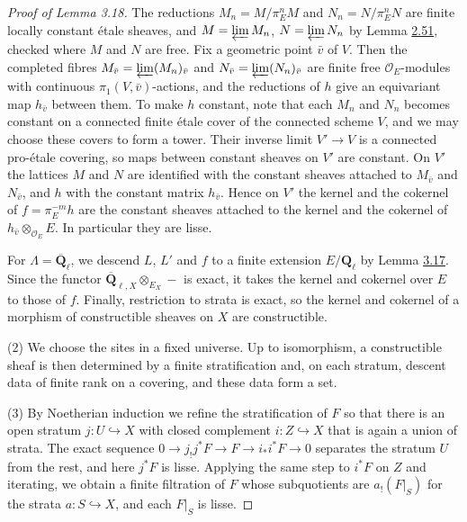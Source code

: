 \documentclass[11pt]{article}
\providecommand{\QbarX}{}\renewcommand{\QbarX}{\overline{\mathbf Q}_{\ell,X}}
\begin{document}
\begin{proof}[{Proof of Lemma 3.18}]
The reductions \(M_n=M/\pi_E^nM\) and \(N_n=N/\pi_E^nN\) are finite locally constant étale sheaves, and \(M=\varprojlim M_n\), \(N=\varprojlim N_n\) by Lemma \hyperref[bp158]{2.51}, checked where \(M\) and \(N\) are free. Fix a geometric point \(\bar v\) of \(V\). Then the completed fibres \(M_{\bar v}=\varprojlim(M_n)_{\bar v}\) and \(N_{\bar v}=\varprojlim(N_n)_{\bar v}\) are finite free \(\mathcal O_E\)-modules with continuous \(\pi_1(V,\bar v)\)-actions, and the reductions of \(h\) give an equivariant map \(h_{\bar v}\) between them. To make \(h\) constant, note that each \(M_n\) and \(N_n\) becomes constant on a connected finite étale cover of the connected scheme \(V\), and we may choose these covers to form a tower. Their inverse limit \(V'\to V\) is a connected pro-étale covering, so maps between constant sheaves on \(V'\) are constant. On \(V'\) the lattices \(M\) and \(N\) are identified with the constant sheaves attached to \(M_{\bar v}\) and \(N_{\bar v}\), and \(h\) with the constant matrix \(h_{\bar v}\). Hence on \(V'\) the kernel and the cokernel of \(f=\pi_E^{-m}h\) are the constant sheaves attached to the kernel and the cokernel of \(h_{\bar v}\otimes_{\mathcal O_E}E\). In particular they are lisse.

For \(\Lambda=\overline{\mathbf Q}_\ell\), we descend \(L\), \(L'\) and \(f\) to a finite extension \(E/\mathbf Q_\ell\) by Lemma \hyperref[bp245]{3.17}. Since the functor \(\QbarX\otimes_{E_X}-\) is exact, it takes the kernel and cokernel over \(E\) to those of \(f\). Finally, restriction to strata is exact, so the kernel and cokernel of a morphism of constructible sheaves on \(X\) are constructible.

(2) We choose the sites in a fixed universe. Up to isomorphism, a constructible sheaf is then determined by a finite stratification and, on each stratum, descent data of finite rank on a covering, and these data form a set.

(3) By Noetherian induction we refine the stratification of \(F\) so that there is an open stratum \(j:U\hookrightarrow X\) with closed complement \(i:Z\hookrightarrow X\) that is again a union of strata. The exact sequence \(0\to j_!j^*F\to F\to i_*i^*F\to0\) separates the stratum \(U\) from the rest, and here \(j^*F\) is lisse. Applying the same step to \(i^*F\) on \(Z\) and iterating, we obtain a finite filtration of \(F\) whose subquotients are \(a_!(F|_S)\) for the strata \(a:S\hookrightarrow X\), and each \(F|_S\) is lisse.
\end{proof}
\end{document}
